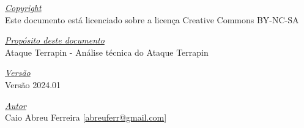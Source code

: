 \documentclass[12pt]{article}
\begin{document}
\pagebreak

\vspace*{\fill}
\begin{flushright}
	\underline{\textit{Copyright}}\\
	Este documento está licenciado sobre a licença Creative Commons BY-NC-SA\bigskip

	\underline{\textit{Propósito deste documento}}\\
	Ataque Terrapin - Análise técnica do Ataque Terrapin\bigskip

	\underline{\textit{Versão}}\\
	Versão 2024.01\bigskip

	\underline{\textit{Autor}}\\
	Caio Abreu Ferreira [\href{mailto:abreuferr@gmail.com}{abreuferr@gmail.com}] \bigskip\\
\end{flushright}
\end{document}
